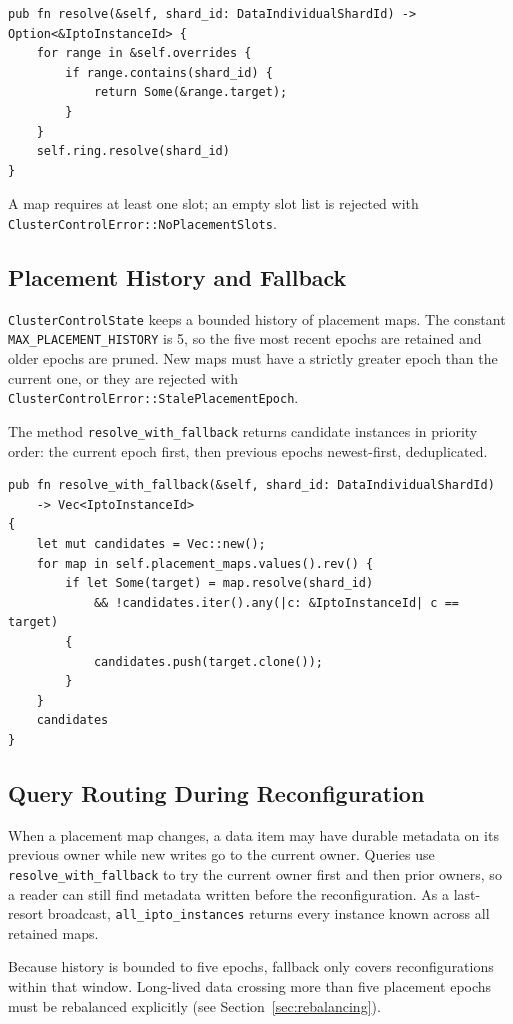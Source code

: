 \begin{lstlisting}
pub fn resolve(&self, shard_id: DataIndividualShardId) -> Option<&IptoInstanceId> {
    for range in &self.overrides {
        if range.contains(shard_id) {
            return Some(&range.target);
        }
    }
    self.ring.resolve(shard_id)
}
\end{lstlisting}

A map requires at least one slot; an empty slot list is rejected with
\texttt{ClusterControlError::NoPlacementSlots}.

\subsection{Placement History and Fallback}

\texttt{ClusterControlState} keeps a bounded history of placement maps. The
constant \texttt{MAX\_PLACEMENT\_HISTORY} is 5, so the five most recent epochs
are retained and older epochs are pruned. New maps must have a strictly greater
epoch than the current one, or they are rejected with
\texttt{ClusterControlError::StalePlacementEpoch}.

The method \texttt{resolve\_with\_fallback} returns candidate instances in
priority order: the current epoch first, then previous epochs newest-first,
deduplicated.

\begin{lstlisting}
pub fn resolve_with_fallback(&self, shard_id: DataIndividualShardId)
    -> Vec<IptoInstanceId>
{
    let mut candidates = Vec::new();
    for map in self.placement_maps.values().rev() {
        if let Some(target) = map.resolve(shard_id)
            && !candidates.iter().any(|c: &IptoInstanceId| c == target)
        {
            candidates.push(target.clone());
        }
    }
    candidates
}
\end{lstlisting}

\subsection{Query Routing During Reconfiguration}

When a placement map changes, a data item may have durable metadata on its
previous owner while new writes go to the current owner. Queries use
\texttt{resolve\_with\_fallback} to try the current owner first and then prior
owners, so a reader can still find metadata written before the reconfiguration.
As a last-resort broadcast, \texttt{all\_ipto\_instances} returns every instance
known across all retained maps.

\begin{vnote}
Because history is bounded to five epochs, fallback only covers reconfigurations
within that window. Long-lived data crossing more than five placement epochs
must be rebalanced explicitly (see Section~\ref{sec:rebalancing}).
\end{vnote}

\endinput
